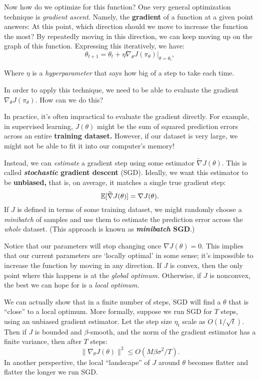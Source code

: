 \documentclass[../main/main]{subfiles}
\begin{document}
Now how do we optimize for this function?
One very general optimization technique is \emph{gradient ascent.} Namely, the \textbf{gradient} of a function at a given point answers: At this point, which direction should we move to increase the function the most? By repeatedly moving in this direction, we can keep moving up on the graph of this function. Expressing this iteratively, we have: \[
    \theta_{t+1} = \theta_t + \eta \nabla_\theta J(\pi_\theta) \Big|_{\theta = \theta_t},
\]

Where $\eta$ is a \emph{hyperparameter} that says how big of a step to take each time.

In order to apply this technique, we need to be able to evaluate the gradient $\nabla_\theta J(\pi_\theta).$ How can we do this?

In practice, it's often impractical to evaluate the gradient directly. For example, in supervised learning, $J(\theta)$ might be the sum of squared prediction errors across an entire \textbf{training dataset.} However, if our dataset is very large, we might not be able to fit it into our computer's memory!

Instead, we can \emph{estimate} a gradient step using some estimator $\tilde \nabla J(\theta).$ This is called \textbf{\emph{stochastic} gradient descent} (SGD). Ideally, we want this estimator to be \textbf{unbiased,} that is, on average, it matches a single true gradient step:
\[ \operatorname*{\mathbb{E}} [\widetilde \nabla J(\theta)] = \nabla J(\theta). \]
If $J$ is defined in terms of some training dataset, we might randomly choose a \emph{minibatch} of samples and use them to estimate the prediction error across the \emph{whole} dataset. (This approach is known as \textbf{\emph{minibatch} SGD}.)

Notice that our parameters will stop changing once $\nabla J(\theta) = 0.$ This implies that our current parameters are `locally optimal' in some sense; it's impossible to increase the function by moving in any direction. If $J$ is convex, then the only point where this happens is at the \emph{global optimum.} Otherwise, if $J$ is nonconvex, the best we can hope for is a \emph{local optimum.}

We can actually show that in a finite number of steps, SGD will find a $\theta$ that is ``close'' to a local optimum. More formally, suppose we run SGD for $T$ steps, using an unbiased gradient estimator. Let the step size $\eta_t$ scale as $O(1/ \sqrt{t}).$ Then if $J$ is bounded and $\beta$-smooth, and the norm of the gradient estimator has a finite variance, then after $T$ steps: \[
    \|\nabla_\theta J(\theta)\|^2 \le O \left( M \beta \sigma^2 / T\right).
\]
In another perspective, the local ``landscape'' of $J$ around $\theta$ becomes flatter and flatter the longer we run SGD.
\end{document}
